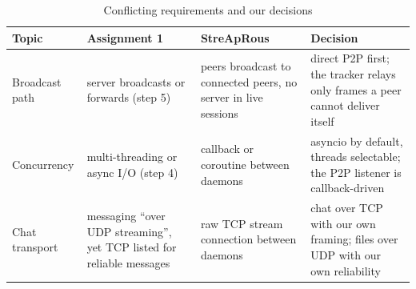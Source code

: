\begin{table}[H]\centering\footnotesize
\caption{Conflicting requirements and our decisions}\label{tab:conflicts}
\begin{tabularx}{\textwidth}{@{}>{\raggedright\arraybackslash}p{2.6cm} Y Y Y@{}}
\toprule
\textbf{Topic} & \textbf{Assignment 1} & \textbf{StreApRous} & \textbf{Decision} \\
\midrule
Broadcast path & server broadcasts or forwards (step 5) & peers broadcast to connected peers, no server in live sessions & direct P2P first; the tracker relays only frames a peer cannot deliver itself \\
Concurrency & multi-threading or async I/O (step 4) & callback or coroutine between daemons & asyncio by default, threads selectable; the P2P listener is callback-driven \\
Chat transport & messaging ``over UDP streaming'', yet TCP listed for reliable messages & raw TCP stream connection between daemons & chat over TCP with our own framing; files over UDP with our own reliability \\
\bottomrule
\end{tabularx}
\end{table}
